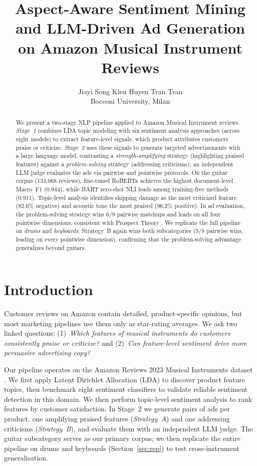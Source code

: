 \documentclass[11pt]{article}
\title{Aspect-Aware Sentiment Mining and LLM-Driven Ad Generation\\
       on Amazon Musical Instrument Reviews}
\author{
  Jiayi Song \quad  Kieu Huyen Tran Tran\\[2pt]
  Bocconi University, Milan \\
}
\begin{document}
\maketitle

\begin{abstract}
We present a two-stage NLP pipeline applied to Amazon Musical
Instrument reviews.
\textit{Stage~1} combines LDA topic modeling with six sentiment
analysis approaches (across eight models) to extract feature-level
signals: which product attributes customers praise or criticize.
\textit{Stage~2} uses these signals to generate targeted
advertisements with a large language model, contrasting a
\textit{strength-amplifying} strategy (highlighting praised features)
against a \textit{problem-solving} strategy (addressing criticisms);
an independent LLM judge evaluates the ads via pairwise and pointwise
protocols.
On the guitar corpus (134{,}068 reviews), fine-tuned RoBERTa
\cite{liu2019roberta} achieves the highest document-level Macro~F1
(0.944), while BART zero-shot NLI \cite{lewis2020bart} leads among
training-free methods (0.911).
Topic-level analysis identifies shipping damage as the most
criticized feature (82.6\% negative) and acoustic tone the most
praised (96.2\% positive).
In ad evaluation, the problem-solving strategy wins 6/9 pairwise
matchups and leads on all four pointwise dimensions, consistent
with Prospect Theory \cite{kahneman1979prospect}.
We replicate the full pipeline on \textit{drums} and
\textit{keyboards}: Strategy~B again wins both subcategories
(5/8 pairwise wins, leading on every pointwise dimension), confirming
that the problem-solving advantage generalizes beyond guitars.
\end{abstract}

\section{Introduction}

Customer reviews on Amazon contain detailed, product-specific
opinions, but most marketing pipelines use them only as star-rating
averages.
We ask two linked questions: (1)~\textit{Which features of musical
instruments do customers consistently praise or criticize?} and
(2)~\textit{Can feature-level sentiment drive more persuasive
advertising copy?}

Our pipeline operates on the Amazon Reviews 2023 Musical Instruments
dataset \cite{hou2024bridging}.
We first apply Latent Dirichlet Allocation (LDA) \cite{blei2003lda}
to discover product feature topics, then benchmark eight sentiment
classifiers to validate reliable sentiment detection in this domain.
We then perform topic-level sentiment analysis to rank features by
customer satisfaction.
In Stage~2 we generate pairs of ads per product, one amplifying
praised features (\textit{Strategy~A}) and one addressing criticisms
(\textit{Strategy~B}), and evaluate them with an independent LLM
judge.
The guitar subcategory serves as our primary corpus; we then
replicate the entire pipeline on drums and keyboards
(Section~\ref{sec:rep}) to test cross-instrument generalisation.
\end{document}

